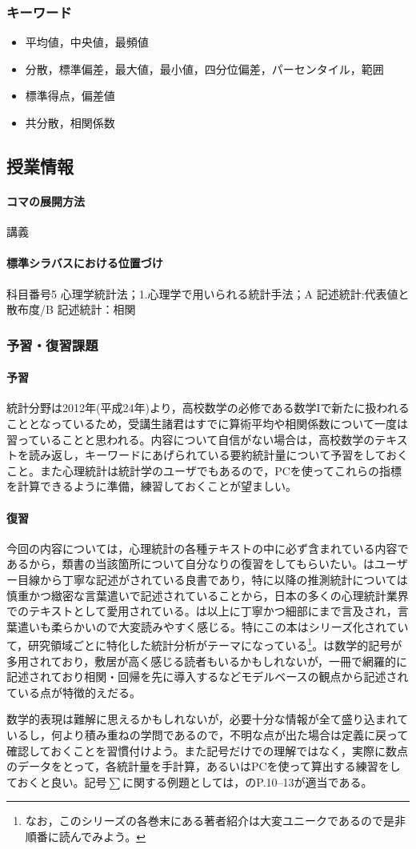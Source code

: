 \subsubsection{キーワード}
\begin{itemize}
\item 平均値，中央値，最頻値
\item 分散，標準偏差，最大値，最小値，四分位偏差，パーセンタイル，範囲
\item 標準得点，偏差値
\item 共分散，相関係数
\end{itemize}
\subsection{授業情報}
\paragraph{コマの展開方法}
講義
\paragraph{標準シラバスにおける位置づけ}
科目番号5 心理学統計法；1.心理学で用いられる統計手法；A 記述統計:代表値と散布度/B 記述統計：相関
\subsubsection{予習・復習課題}
\paragraph{予習}
統計分野は2012年(平成24年)より，高校数学の必修である数学Iで新たに扱われることとなっているため，受講生諸君はすでに算術平均や相関係数について一度は習っていることと思われる。内容について自信がない場合は，高校数学のテキストを読み返し，キーワードにあげられている要約統計量について予習をしておくこと。また心理統計は統計学のユーザでもあるので，PCを使ってこれらの指標を計算できるように準備，練習しておくことが望ましい。
\paragraph{復習}
今回の内容については，心理統計の各種テキストの中に必ず含まれている内容であるから，類書の当該箇所について自分なりの復習をしてもらいたい。\citet{Yamada2004}はユーザー目線から丁寧な記述がされている良書であり，特に以降の推測統計については慎重かつ緻密な言葉遣いで記述されていることから，日本の多くの心理統計業界でのテキストとして愛用されている。\citet{川端201408}は\citet{Yamada2004}以上に丁寧かつ細部にまで言及され，言葉遣いも柔らかいので大変読みやすく感じる。特にこの本はシリーズ化されていて，研究領域ごとに特化した統計分析がテーマになっている\footnote{なお，このシリーズの各巻末にある著者紹介は大変ユニークであるので是非順番に読んでみよう。}。\citet{山内201001}は数学的記号が多用されており，敷居が高く感じる読者もいるかもしれないが，一冊で網羅的に記述されており相関・回帰を先に導入するなどモデルベースの観点から記述されている点が特徴的えだる。

数学的表現は難解に思えるかもしれないが，必要十分な情報が全て盛り込まれているし，何より積み重ねの学問であるので，不明な点が出た場合は定義に戻って確認しておくことを習慣付けよう。また記号だけでの理解ではなく，実際に数点のデータをとって，各統計量を手計算，あるいはPCを使って算出する練習をしておくと良い。記号$\sum$に関する例題としては，\citet{山内201001}のP.10--13が適当である。
